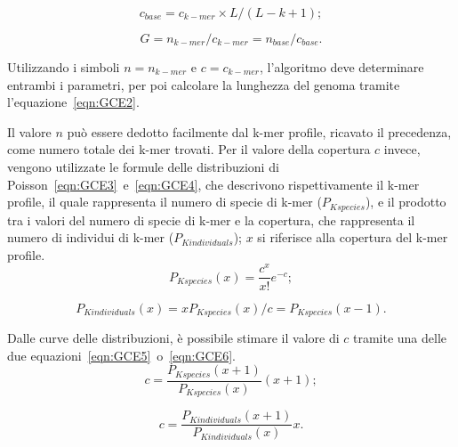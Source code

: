 \documentclass[crop=false, class=book]{standalone}
\begin{document}
	\begin{equation}
		\label{eqn:GCE1}
		c_{base} = c_{k-mer} \times L / (L-k+1);
	\end{equation}

	\begin{equation}
		\label{eqn:GCE2}
		G = n_{k-mer} / c_{k-mer} = n_{base} / c_{base}.
	\end{equation}
	
	Utilizzando i simboli $n = n_{k-mer}$ e $c = c_{k-mer}$, l'algoritmo deve determinare entrambi i parametri, per poi calcolare la lunghezza del genoma tramite l'equazione~\vref{eqn:GCE2}.
	
	Il valore $n$ può essere dedotto facilmente dal k-mer profile, ricavato il precedenza, come numero totale dei k-mer trovati. Per il valore della copertura $c$ invece, vengono utilizzate le formule delle distribuzioni di Poisson~\vref{eqn:GCE3}~e~\vref{eqn:GCE4}, che descrivono rispettivamente il k-mer profile, il quale rappresenta il numero di specie di k-mer ($P_{Kspecies}$), e il prodotto tra i valori del numero di specie di k-mer e la copertura, che rappresenta il numero di individui di k-mer ($P_{Kindividuals}$); $x$ si riferisce alla copertura del k-mer profile.
	\begin{equation}
		\label{eqn:GCE3}
		P_{Kspecies}(x) = \frac{c^x}{x!} e^{-c};
	\end{equation}

	\begin{equation}
		\label{eqn:GCE4}
		P_{Kindividuals}(x) = x P_{Kspecies}(x) / c = P_{Kspecies}(x-1).
	\end{equation}
	
	Dalle curve delle distribuzioni, è possibile stimare il valore di $c$ tramite una delle due equazioni~\vref{eqn:GCE5}~o~\vref{eqn:GCE6}.
	\begin{equation}
		\label{eqn:GCE5}
		c = \frac{P_{Kspecies}(x+1)}{P_{Kspecies}(x)} (x+1);
	\end{equation}
	
	\begin{equation}
		\label{eqn:GCE6}
		c = \frac{P_{Kindividuals}(x+1)}{P_{Kindividuals}(x)} x.
	\end{equation}
\end{document}
